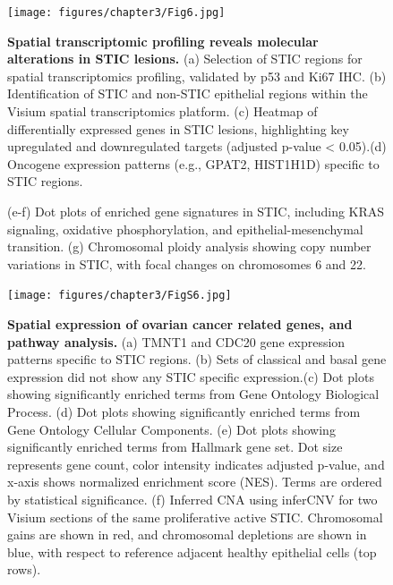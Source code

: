 \begin{refsection}
    \begin{figure}[p]
        \begin{center}
            \texttt{[image: figures/chapter3/Fig6.jpg]}
            \captionsetup{font=small}
            \caption{\textbf{ Spatial transcriptomic profiling reveals molecular alterations in STIC lesions.} (a) Selection of STIC regions for spatial transcriptomics profiling, validated by p53 and Ki67 IHC. (b) Identification of STIC and non-STIC epithelial regions within the Visium spatial transcriptomics platform. (c) Heatmap of differentially expressed genes in STIC lesions, highlighting key upregulated and downregulated targets (adjusted p-value < 0.05).(d) Oncogene expression patterns (e.g., GPAT2, HIST1H1D) specific to STIC regions. }
            \label{chapter3_fig6}
        \end{center}
    \end{figure}
    
    \begin{figure}[h!]
        \ContinuedFloat
        \captionsetup{font=small}
        \caption[]{(e-f) Dot plots of enriched gene signatures in STIC, including KRAS signaling, oxidative phosphorylation, and epithelial-mesenchymal transition. (g) Chromosomal ploidy analysis showing copy number variations in STIC, with focal changes on chromosomes 6 and 22.}
    \end{figure}

    \begin{figure}[p]
        \begin{center}
            \texttt{[image: figures/chapter3/FigS6.jpg]}
            \captionsetup{font=small}
            \caption{ \textbf{Spatial expression of ovarian cancer related genes, and pathway analysis.} (a)  TMNT1 and CDC20 gene expression patterns specific to STIC regions. (b) Sets of classical and basal gene expression did not show any STIC specific expression.(c) Dot plots showing significantly enriched terms from Gene Ontology Biological Process. (d) Dot plots showing significantly enriched terms from Gene Ontology Cellular Components. (e) Dot plots showing significantly enriched terms from Hallmark gene set. Dot size represents gene count, color intensity indicates adjusted p-value, and x-axis shows normalized enrichment score (NES). Terms are ordered by statistical significance. (f) Inferred CNA using inferCNV for two Visium sections of the same proliferative active STIC. Chromosomal gains are shown in red, and chromosomal depletions are shown in blue, with respect to reference adjacent healthy epithelial cells (top rows).}
            \label{chapter3_figS6}
        \end{center}
    \end{figure}


\end{refsection}
